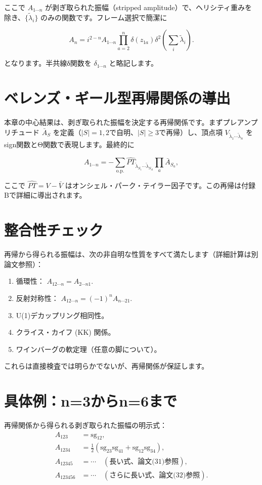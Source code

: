 \documentclass[dvipdfmx,a4paper]{jsbook}
\theoremstyle{definition}
\theoremstyle{remark}
\begin{document}
ここで \(A_{1\cdots n}\) が剥ぎ取られた振幅（stripped amplitude）で、ヘリシティ重みを除き、\(\{\tilde{\lambda}_i\}\) のみの関数です。フレーム選択で簡潔に

\[
A_n = i^{2-n} A_{1\cdots n} \prod_{a=2}^n \delta(z_{1a}) \delta^2\left( \sum_i \tilde{\lambda}_i \right).
\]

となります。半共線δ関数を \(\delta_{1\cdots n}\) と略記します。

\section{ベレンズ・ギール型再帰関係の導出}

本章の中心結果は、剥ぎ取られた振幅を決定する再帰関係です。まずプレアンプリチュード \(\bar{A}_S\) を定義（$|S|=1,2$で自明、$|S| \ge 3$で再帰）し、頂点項 \(V_{\tilde{\lambda}_1 \cdots \tilde{\lambda}_n}\) をsign関数とΘ関数で表現します。最終的に

\[
A_{1\cdots n} = -\sum_{\text{o.p.}} \hat{PT}_{\tilde{\lambda}_{S_1}\cdots\tilde{\lambda}_{S_A}} \prod_a \bar{A}_{S_a},
\]

ここで \(\hat{PT} = V - \bar{V}\) はオンシェル・パーク・テイラー因子です。この再帰は付録Bで詳細に導出されます。

\section{整合性チェック}

再帰から得られる振幅は、次の非自明な性質をすべて満たします（詳細計算は別論文参照）：
\begin{enumerate}
  \item 循環性： \(A_{12\cdots n} = A_{2\cdots n1}\).
  \item 反射対称性： \(A_{12\cdots n} = (-1)^n A_{n\cdots 21}\).
  \item U(1)デカップリング相同性。
  \item クライス・カイフ (KK) 関係。
  \item ワインバーグの軟定理（任意の脚について）。
\end{enumerate}

これらは直接検査では明らかでないが、再帰関係が保証します。

\section{具体例：n=3からn=6まで}

再帰関係から得られる剥ぎ取られた振幅の明示式：
\begin{align}
  A_{123} &= \mathrm{sg}_{12}, \\
  A_{1234} &= \frac{1}{2}(\mathrm{sg}_{23}\mathrm{sg}_{41} + \mathrm{sg}_{12}\mathrm{sg}_{34}), \\
  A_{12345} &= \cdots \quad (\text{長い式、論文(31)参照}), \\
  A_{123456} &= \cdots \quad (\text{さらに長い式、論文(32)参照}).
\end{align}
\end{document}
